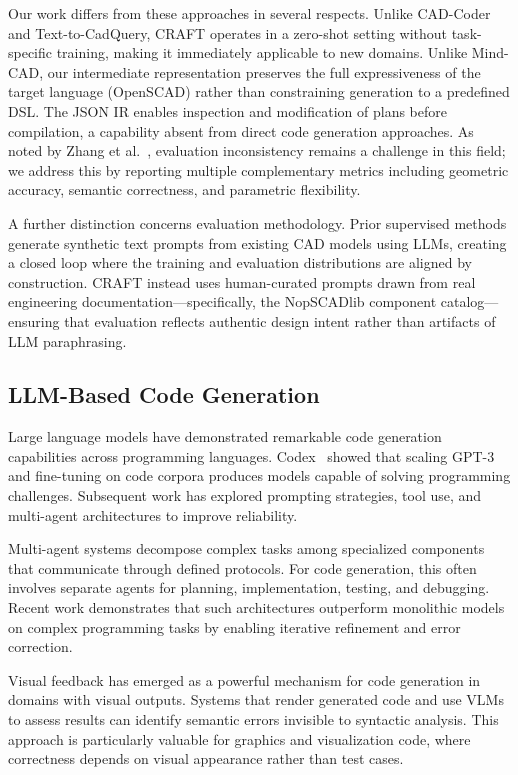 \documentclass[5p,twocolumn,10pt,times]{elsarticle}
\begin{document}
Our work differs from these approaches in several respects. Unlike CAD-Coder and Text-to-CadQuery, CRAFT operates in a zero-shot setting without task-specific training, making it immediately applicable to new domains. Unlike Mind-CAD, our intermediate representation preserves the full expressiveness of the target language (OpenSCAD) rather than constraining generation to a predefined DSL. The JSON IR enables inspection and modification of plans before compilation, a capability absent from direct code generation approaches. As noted by Zhang et al.~\cite{zhang2026llmcad}, evaluation inconsistency remains a challenge in this field; we address this by reporting multiple complementary metrics including geometric accuracy, semantic correctness, and parametric flexibility.

A further distinction concerns evaluation methodology. Prior supervised methods generate synthetic text prompts from existing CAD models using LLMs, creating a closed loop where the training and evaluation distributions are aligned by construction. CRAFT instead uses human-curated prompts drawn from real engineering documentation---specifically, the NopSCADlib component catalog---ensuring that evaluation reflects authentic design intent rather than artifacts of LLM paraphrasing.

\subsection{LLM-Based Code Generation}

Large language models have demonstrated remarkable code generation capabilities across programming languages. Codex~\cite{chen2021codex} showed that scaling GPT-3 and fine-tuning on code corpora produces models capable of solving programming challenges. Subsequent work has explored prompting strategies, tool use, and multi-agent architectures to improve reliability.

Multi-agent systems decompose complex tasks among specialized components that communicate through defined protocols. For code generation, this often involves separate agents for planning, implementation, testing, and debugging. Recent work demonstrates that such architectures outperform monolithic models on complex programming tasks by enabling iterative refinement and error correction.

Visual feedback has emerged as a powerful mechanism for code generation in domains with visual outputs. Systems that render generated code and use VLMs to assess results can identify semantic errors invisible to syntactic analysis. This approach is particularly valuable for graphics and visualization code, where correctness depends on visual appearance rather than test cases.
\end{document}
